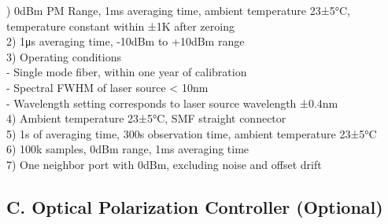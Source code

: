 \begingroup
{}
\begin{spacing}{1.3}
) 0dBm PM Range, 1ms averaging time, ambient temperature 23±5°C, temperature constant within ±1K after zeroing\\
2) 1μs averaging time, -10dBm to +10dBm range\\
3) Operating conditions\\
- Single mode fiber, within one year of calibration\\
- Spectral FWHM of laser source < 10nm\\
- Wavelength setting corresponds to laser source wavelength ±0.4nm\\
4) Ambient temperature 23±5°C, SMF straight connector\\
5) 1s of averaging time, 300s observation time, ambient temperature 23±5°C\\
6) 100k samples, 0dBm range, 1ms averaging time\\
7) One neighbor port with 0dBm, excluding noise and offset drift\\
\end{spacing}
\endgroup


\subsection{C. Optical Polarization Controller (Optional)}
\begin{tabular}{>{\sffamily}m{50mm}>{\sffamily}m{70mm}}
\hline
\multicolumn{2}{>{\sffamily}m{120mm}}{ \center{(TBD)} }\\\hline
\end{tabular}

